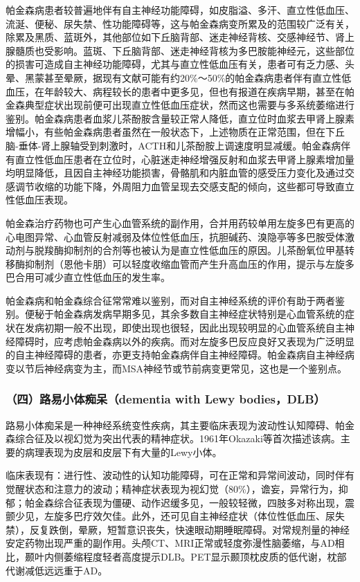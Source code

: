 帕金森病患者较普遍地伴有自主神经功能障碍，如皮脂溢、多汗、直立性低血压、流涎、便秘、尿失禁、性功能障碍等，这与帕金森病变所累及的范围较广泛有关，除累及黑质、蓝斑外，其他部位如下丘脑背部、迷走神经背核、交感神经节、肾上腺髓质也受影响。蓝斑、下丘脑背部、迷走神经背核为多巴胺能神经元，这些部位的损害可造成自主神经功能障碍，尤其与直立性低血压有关，患者可有乏力感、头晕、黑蒙甚至晕厥，据现有文献可能有约20\%～50\%的帕金森病患者伴有直立性低血压，在年龄较大、病程较长的患者中更多见，但也有报道在疾病早期，甚至在帕金森典型症状出现前便可出现直立性低血压症状，然而这也需要与多系统萎缩进行鉴别。帕金森病患者血浆儿茶酚胺含量较正常人降低，直立位时血浆去甲肾上腺素增幅小，有些帕金森病患者虽然在一般状态下，上述物质在正常范围，但在下丘脑-垂体-肾上腺轴受到刺激时，ACTH和儿茶酚胺上调速度明显减缓。帕金森病伴有直立性低血压患者在立位时，心脏迷走神经增强反射和血浆去甲肾上腺素增加量均明显降低，且因自主神经功能损害，骨骼肌和内脏血管的感受压力变化及通过交感调节收缩的功能下降，外周阻力血管呈现去交感支配的倾向，这些都可导致直立性低血压表现。

帕金森治疗药物也可产生心血管系统的副作用，合并用药较单用左旋多巴有更高的心电图异常、心血管反射减弱及体位性低血压，抗胆碱药、溴隐亭等多巴胺受体激动剂与脱羧酶抑制剂的合剂等也被认为是直立性低血压的原因。儿茶酚氧位甲基转移酶抑制剂（恩他卡朋）可以轻度收缩血管而产生升高血压的作用，提示与左旋多巴合用可减少直立性低血压的发生率。

帕金森病和帕金森综合征常常难以鉴别，而对自主神经系统的评价有助于两者鉴别。便秘于帕金森病发病早期多见，其余多数自主神经症状特别是心血管系统的症状在发病初期一般不出现，即使出现也很轻，因此出现较明显的心血管系统自主神经障碍时，应考虑帕金森病以外的疾病。而对左旋多巴反应良好又表现为广泛明显的自主神经障碍的患者，亦更支持帕金森病伴自主神经障碍。帕金森病自主神经病变以节后神经病变为主，而MSA神经节或节前病变更常见，这也是一个鉴别点。

\subsubsection{（四）路易小体痴呆（dementia with Lewy bodies，DLB）}

路易小体痴呆是一种神经系统变性疾病，其主要临床表现为波动性认知障碍、帕金森综合征及以视幻觉为突出代表的精神症状。1961年Okazaki等首次描述该病。主要的病理表现为皮层和皮层下有大量的Lewy小体。

临床表现有：进行性、波动性的认知功能障碍，可在正常和异常间波动，同时伴有觉醒状态和注意力的波动；精神症状表现为视幻觉（80\%），谵妄，异常行为，抑郁；帕金森综合征表现为僵硬、动作迟缓多见，一般较轻微，四肢多对称出现，震颤少见，左旋多巴疗效欠佳。此外，还可见自主神经症状（体位性低血压、尿失禁），反复跌倒，晕厥，短暂意识丧失，快速眼动期睡眠障碍。对常规剂量的神经安定药物出现严重的副作用。头颅CT、MRI正常或轻度弥漫性脑萎缩，与AD相比，颞叶内侧萎缩程度轻者高度提示DLB。PET显示颞顶枕皮质的低代谢，枕部代谢减低远远重于AD。

